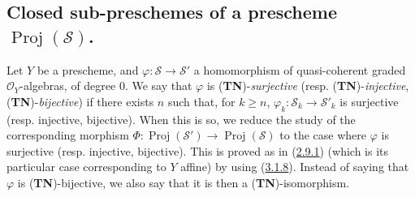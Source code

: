 \subsection{Closed sub-preschemes of a prescheme
$\operatorname{Proj}(\mathcal{S})$.}
\label{subsection:II.3.6}

\begin{env}[3.6.1]
\label{II.3.6.1}
Let $Y$ be a prescheme, and
$\varphi:\mathcal{S}\to\mathcal{S}'$ a homomorphism of quasi-coherent graded
$\mathcal{O}_Y$-algebras, of degree $0$. We say that
$\varphi$ is (\textbf{TN})-\emph{surjective} (resp.
(\textbf{TN})-\emph{injective}, (\textbf{TN})-\emph{bijective}) if there exists $n$
such that, for $k\geq n$, $\varphi_k:\mathcal{S}_k\to\mathcal{S}'_k$ is
surjective (resp. injective, bijective). When this is so, we reduce the study
of the corresponding morphism
$\Phi:\operatorname{Proj}(\mathcal{S}')\to\operatorname{Proj}(\mathcal{S})$
to the case where $\varphi$ is surjective (resp. injective, bijective).
This is proved as in (\hyperref[II.2.9.1]{2.9.1}) (which is its
particular case corresponding to $Y$ affine) by using
(\hyperref[II.3.1.8]{3.1.8}). Instead of saying that $\varphi$ is
(\textbf{TN})-bijective, we also say that it is then a
(\textbf{TN})-isomorphism.
\end{env}

